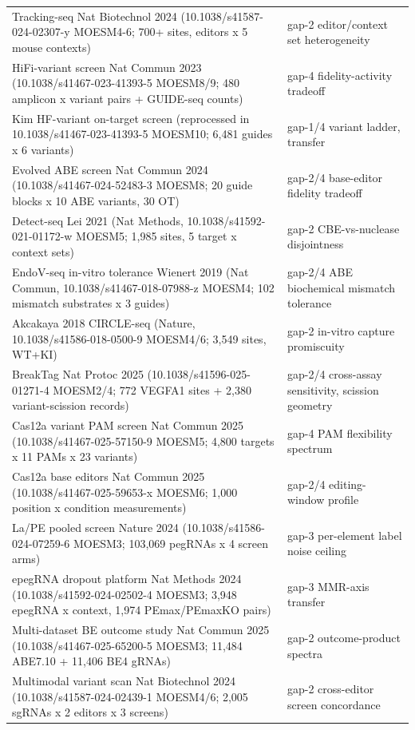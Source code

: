 \begin{longtable}{@{}p{}p{}@{}}
Tracking-seq Nat Biotechnol 2024 (10.1038/s41587-024-02307-y MOESM4-6; 700+ sites, editors x 5 mouse contexts) & gap-2 editor/context set heterogeneity \\
HiFi-variant screen Nat Commun 2023 (10.1038/s41467-023-41393-5 MOESM8/9; 480 amplicon x variant pairs + GUIDE-seq counts) & gap-4 fidelity-activity tradeoff \\
Kim HF-variant on-target screen (reprocessed in 10.1038/s41467-023-41393-5 MOESM10; 6,481 guides x 6 variants) & gap-1/4 variant ladder, transfer \\
Evolved ABE screen Nat Commun 2024 (10.1038/s41467-024-52483-3 MOESM8; 20 guide blocks x 10 ABE variants, 30 OT) & gap-2/4 base-editor fidelity tradeoff \\
Detect-seq Lei 2021 (Nat Methods, 10.1038/s41592-021-01172-w MOESM5; 1,985 sites, 5 target x context sets) & gap-2 CBE-vs-nuclease disjointness \\
EndoV-seq in-vitro tolerance Wienert 2019 (Nat Commun, 10.1038/s41467-018-07988-z MOESM4; 102 mismatch substrates x 3 guides) & gap-2/4 ABE biochemical mismatch tolerance \\
Akcakaya 2018 CIRCLE-seq (Nature, 10.1038/s41586-018-0500-9 MOESM4/6; 3,549 sites, WT+KI) & gap-2 in-vitro capture promiscuity \\
BreakTag Nat Protoc 2025 (10.1038/s41596-025-01271-4 MOESM2/4; 772 VEGFA1 sites + 2,380 variant-scission records) & gap-2/4 cross-assay sensitivity, scission geometry \\
Cas12a variant PAM screen Nat Commun 2025 (10.1038/s41467-025-57150-9 MOESM5; 4,800 targets x 11 PAMs x 23 variants) & gap-4 PAM flexibility spectrum \\
Cas12a base editors Nat Commun 2025 (10.1038/s41467-025-59653-x MOESM6; 1,000 position x condition measurements) & gap-2/4 editing-window profile \\
La/PE pooled screen Nature 2024 (10.1038/s41586-024-07259-6 MOESM3; 103,069 pegRNAs x 4 screen arms) & gap-3 per-element label noise ceiling \\
epegRNA dropout platform Nat Methods 2024 (10.1038/s41592-024-02502-4 MOESM3; 3,948 epegRNA x context, 1,974 PEmax/PEmaxKO pairs) & gap-3 MMR-axis transfer \\
Multi-dataset BE outcome study Nat Commun 2025 (10.1038/s41467-025-65200-5 MOESM3; 11,484 ABE7.10 + 11,406 BE4 gRNAs) & gap-2 outcome-product spectra \\
Multimodal variant scan Nat Biotechnol 2024 (10.1038/s41587-024-02439-1 MOESM4/6; 2,005 sgRNAs x 2 editors x 3 screens) & gap-2 cross-editor screen concordance \\

\end{longtable}
